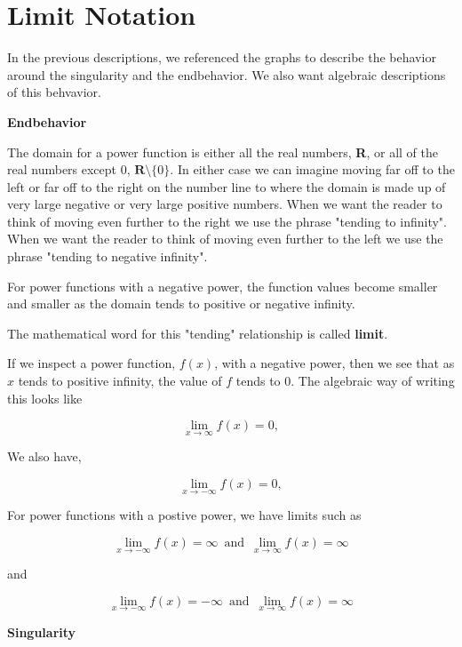 \documentclass{ximera}
\begin{document}
\section{Limit Notation}



In the previous descriptions, we referenced the graphs to describe the behavior around the singularity and the endbehavior.  We also want algebraic descriptions of this behvavior.


\textbf{Endbehavior}

The domain for a power function is either all the real numbers, \textbf{R}, or all of the real numbers except $0$, $\textbf{R} \setminus \{ 0 \}$.  In either case we can imagine moving far off to the left or far off to the right on the number line to where the domain is made up of very large negative or very large positive numbers.  When we want the reader to think of moving even further to the right we use the phrase "tending to infinity". When we want the reader to think of moving even further to the left we use the phrase "tending to negative infinity".

For power functions with a negative power, the function values become smaller and smaller as the domain tends to positive or negative infinity.

The mathematical word for this "tending" relationship is called \textbf{limit}.

If we inspect a power function, $f(x)$, with a negative power, then we see that as $x$ tends to positive infinity, the value of $f$ tends to $0$.  The algebraic way of writing this looks like


\[    \lim_{x \to \infty} f(x) = 0,        \]


We also have,

\[    \lim_{x \to -\infty} f(x) = 0,        \]



For power functions with a postive power, we have limits such as 



\[    \lim_{x \to -\infty} f(x) =  \infty  \,   \text{ and }  \,     \lim_{x \to \infty} f(x) = \infty      \]


and 

\[    \lim_{x \to -\infty} f(x) =  -\infty  \,   \text{ and }  \,     \lim_{x \to \infty} f(x) = \infty      \]






\textbf{Singularity}
\end{document}
